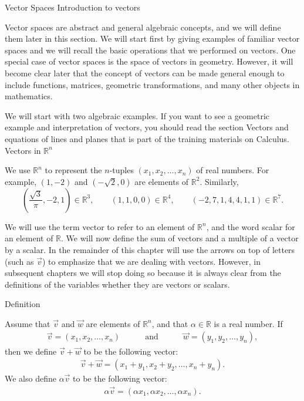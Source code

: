 
Vector Spaces
Introduction to vectors

Vector spaces are abstract and general algebraic concepts, and we will define them later in this section. We will start first by giving examples of familiar vector spaces and we will recall the basic operations that we performed on vectors. One special case of vector spaces is the space of vectors in geometry. However, it will become clear later that the concept of vectors can be made general enough to include functions, matrices, geometric transformations, and many other objects in mathematics.

We will start with two algebraic examples. If you want to see a geometric example and interpretation of vectors, you should read the section Vectors and equations of lines and planes that is part of the training materials on Calculus.
Vectors in \( \mathbb R^n \)

We use \( \mathbb R^n \) to represent the \( n \)-tuples \( (x_1, x_2, \dots, x_n) \) of real numbers. For example, \( (1,-2) \) and \( (-\sqrt 2, 0) \) are elements of \( \mathbb R^2 \). Similarly, \[ \left(\frac{\sqrt 3}{\pi},-2,1\right)\in\mathbb R^3, \quad \quad (1,1,0,0)\in\mathbb R^4,\quad\quad (-2,7,1,4,4,1,1)\in\mathbb R^7.\]

We will use the term vector to refer to an element of \( \mathbb R^n \), and the word scalar for an element of \( \mathbb R \). We will now define the sum of vectors and a multiple of a vector by a scalar. In the remainder of this chapter will use the arrows on top of letters (such as \( \overrightarrow{v} \)) to emphasize that we are dealing with vectors. However, in subsequent chapters we will stop doing so because it is always clear from the definitions of the variables whether they are vectors or scalars.

Definition

Assume that \( \overrightarrow v \) and \( \overrightarrow w \) are elements of \( \mathbb R^n \), and that \( \alpha\in \mathbb R \) is a real number. If \begin{eqnarray*} \overrightarrow v=\left(x_1, x_2, \dots, x_n\right) \quad\quad\quad\mbox{and}\quad\quad\quad \overrightarrow w=\left(y_1, y_2,\dots, y_n\right), \end{eqnarray*} then we define \( \overrightarrow v+\overrightarrow w \) to be the following vector: \begin{eqnarray*} \overrightarrow v+\overrightarrow w=\left(x_1+y_1,x_2+y_2,\dots, x_n+y_n\right). \end{eqnarray*} We also define \( \alpha\overrightarrow v \) to be the following vector: \begin{eqnarray*} \alpha \overrightarrow v=\left(\alpha x_1, \alpha x_2, \dots, \alpha x_n\right). \end{eqnarray*}

